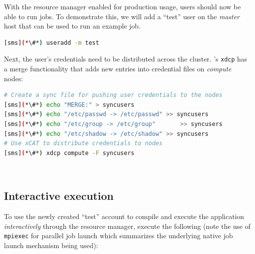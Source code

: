 With the resource manager enabled for production usage, users should now be
able to run jobs. To demonstrate this, we will add a ``test'' user on the {\em master}
host that can be used to run an example job.

\begin{lstlisting}[language=bash,keywords={}]
[sms](*\#*) useradd -m test
\end{lstlisting}

Next, the user's credentials need to be distributed across the cluster.
\xCAT{}'s \texttt{xdcp} has a merge functionality that adds new entries into
credential files on {\em compute} nodes:

\begin{lstlisting}[language=bash,keywords={}]
# Create a sync file for pushing user credentials to the nodes
[sms](*\#*) echo "MERGE:" > syncusers
[sms](*\#*) echo "/etc/passwd -> /etc/passwd" >> syncusers
[sms](*\#*) echo "/etc/group -> /etc/group"       >> syncusers
[sms](*\#*) echo "/etc/shadow -> /etc/shadow" >> syncusers
# Use xCAT to distribute credentials to nodes
[sms](*\#*) xdcp compute -F syncusers
\end{lstlisting}


~\\


\subsection{Interactive execution}
To use the newly created ``test'' account to compile and execute the
application {\em interactively} through the resource manager, execute the
following (note the use of \texttt{mpiexec} for parallel job launch which summarizes
the underlying native job launch mechanism being used):

